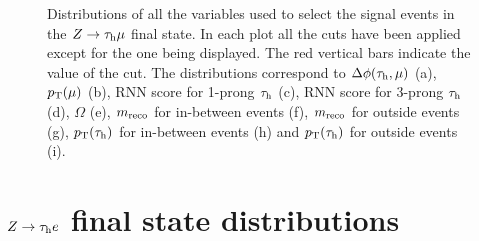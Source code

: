 \begin{figure}[H]\ContinuedFloat
	\centering
	\hfill
	\hfill
	\caption{Distributions of all the variables used to select the signal events in the $Z\to\tau_\text{h}\mu$ final state. In each plot all the cuts have been applied except for the one being displayed. The red vertical bars indicate the value of the cut. The distributions correspond to $\Delta\phi(\tau_\text{h},\mu)$ (a), $p_\text{T}(\mu)$ (b), RNN score for 1-prong $\tau_\text{h}$ (c), RNN score for 3-prong $\tau_\text{h}$ (d), $\Omega$ (e), $m_{\text{reco}}$ for in-between events (f), $m_{\text{reco}}$ for outside events (g), $p_\text{T}(\tau_\text{h})$ for in-between events (h) and $p_\text{T}(\tau_\text{h})$ for outside events (i).}
	\label{Fig17}
\end{figure}%
\newpage
\section{$Z\to\tau_\text{h} e$ final state distributions}


